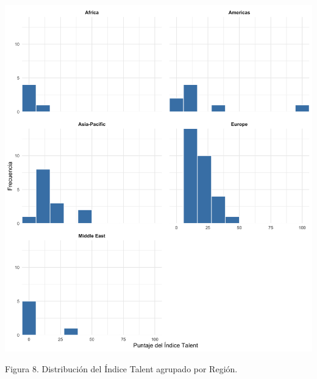 \documentclass[
]{article}
\begin{document}
\begin{multicols}{2}




\begin{center}
\includegraphics[width=\linewidth]{figura8.png}
\end{center}
Figura 8. Distribución del Índice Talent agrupado por Región.





\end{multicols}
\end{document}
